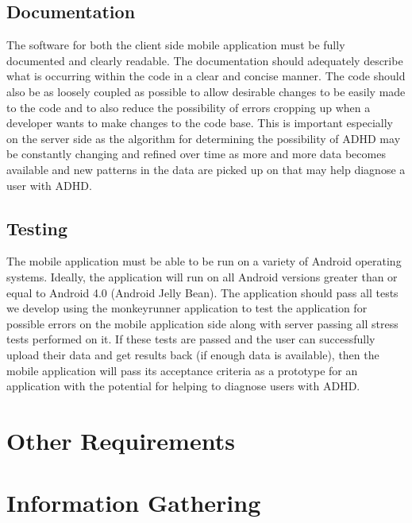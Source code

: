 \documentclass[a4wide]{article}
\begin{document}
\subsection{Documentation}
The software for both the client side mobile application must be fully
documented and clearly readable. The documentation should adequately describe
what is occurring within the code in a clear and concise manner. The code should
also be as loosely coupled as possible to allow desirable changes to be easily
made to the code and to also reduce the possibility of errors cropping up when
a developer wants to make changes to the code base. This is important especially
on the server side as the algorithm for determining the possibility of ADHD may
be constantly changing and refined over time as more and more data becomes
available and new patterns in the data are picked up on that may help diagnose a
user with ADHD.
\subsection{Testing}
The mobile application must be able to be run on a variety of Android operating
systems. Ideally, the application will run on all Android versions greater than
or equal to Android 4.0 (Android Jelly Bean). The application should pass all
tests we develop using the monkeyrunner application to test the application for
possible errors on the mobile application side along with server passing all
stress tests performed on it. If these tests are passed and the user can
successfully upload their data and get results back (if enough data is
available), then the mobile application will pass its acceptance criteria as a
prototype for an application with the potential for helping to diagnose users
with ADHD.




\section{Other Requirements}
\newpage
\appendix
\appendixpage

\section{Information Gathering}
\end{document}
